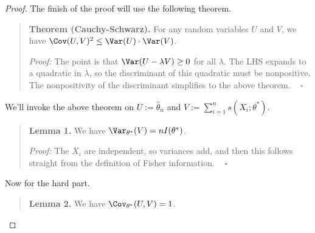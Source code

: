 \begin{proof}
    The finish of the proof will use the following theorem.
    \begin{quote}
        \textbf{Theorem (Cauchy-Schwarz).}
        For any random variables $U$ and $V$,
        we have $\Cov(U, V)^2 \leq \Var(U) \cdot \Var(V)$.

        \emph{Proof:} The point is that $\Var(U - \lambda V) \geq 0$
        for all $\lambda$.  The LHS expands to a quadratic in $\lambda$,
        so the discriminant of this quadratic must be nonpositive.
        The nonpositivity of the discriminant simplifies to the above theorem.
        ~ $\square$
    \end{quote}
    We'll invoke the above theorem on
    $U := \hat{\theta}_n$ and $V := \sum_{i = 1}^n s(X_i; \theta^*)$.
    \begin{quote}
        \textbf{Lemma 1.} We have $\Var_{\theta^*}(V) = nI(\theta^*)$.

        \emph{Proof:} The $X_i$ are independent, so variances add,
        and then this follows straight from the definition of Fisher information. ~ $\square$
    \end{quote}
    Now for the hard part.
    \begin{quote}
        \textbf{Lemma 2.} We have $\Cov_{\theta^*}(U, V) = 1$.


\end{quote}
\end{proof}
